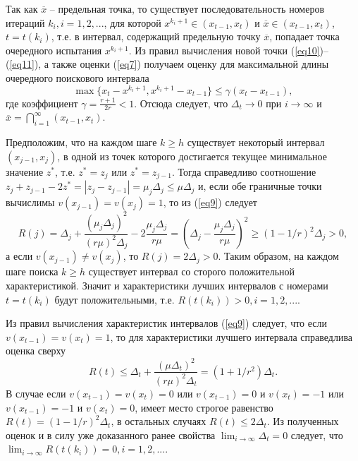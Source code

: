 \documentclass[10pt,a4paper]{book}
\begin{document}
Так как $\overline{x}$ -- предельная точка, то существует последовательность номеров итераций ${k_i}, i = 1, 2, ... $, для которой $x^{k_i+1} \in (x_{t-1}, x_{t})$ и $\overline{x} \in (x_{t-1}, x_{t})$, $t = t(k_i)$, т.е. в интервал, содержащий предельную точку $\overline{x}$, попадает точка очередного испытания $x^{k_{i}+1}$. Из правил вычисления новой точки (\ref{eq10})--(\ref{eq11}), а также оценки (\ref{eq7}) получаем
оценку для максимальной длины очередного поискового интервала
\[
\max\{x_t-x^{k_i+1},x^{k_i+1} - x_{t-1}\} \leq \gamma(x_t - x_{t - 1}),
\]
где коэффициент $\gamma = \frac{r+1}{2r} < 1$. Отсюда следует, что $\Delta_t \to 0$ при $i \to \infty$ и $\overline{x}=\bigcap_{i = 1}^{\infty}{(x_{t-1}, x_t)}$.

Предположим, что на каждом шаге $k \geq h$ существует некоторый интервал $(x_{j-1}, x_{j})$, в одной из точек которого достигается текущее минимальное значение $z^*$, т.е. $z^* = z_j$ или $z^* = z_{j-1}$. Тогда справедливо соотношение $z_j + z_{j-1}-2z^* = |z_j-z_{j-1}| = \mu_j \Delta_j \leq \mu \Delta_j$ и, если обе граничные точки вычислимы $v(x_{j-1}) = v(x_j) = 1$, то из (\ref{eq9}) следует
\[
R(j) = \Delta_j + \frac{(\mu_j \Delta_j)^2}{(r\mu)^2 \Delta_j}-2\frac{\mu_j \Delta_j}{r\mu} = (\Delta_j-\frac{\mu_j\Delta_j}{r\mu})^2 \geq (1-1/r)^2 \Delta_j > 0,
\]
а если $v(x_{j-1}) \neq v(x_j)$, то $R(j)=2\Delta_j>0$. Таким образом, на каждом шаге поиска $k \geq h$ существует интервал со сторого положительной характеристикой. Значит и характеристики лучших интервалов с номерами $t = t(k_i)$ будут положительными, т.е. $R(t(k_i))>0, i = 1, 2, ... $.

Из правил вычисления характеристик интервалов (\ref{eq9}) следует, что если $v(x_{t-1}) = v(x_t) = 1$, то для характеристики лучшего интервала справедлива оценка сверху
\[
R(t) \leq \Delta_t + \frac{(\mu \Delta_t)^2}{(r\mu)^2 \Delta_t} = (1+1/r^2) \Delta_t.
\]
В случае если $v(x_{t-1}) = v(x_t) = 0$ или $v(x_{t-1}) = 0$ и $v(x_t) = -1$ или $v(x_{t-1}) = -1$ и $v(x_t) = 0$, имеет место строгое равенство $R(t) = (1-1/r)^2\Delta_t$, в остальных случаях $R(t) \leq 2\Delta_t$. Из полученных оценок и в силу уже доказанного ранее свойства $\lim_{i \to \infty}{\Delta_t} = 0$ следует, что $\lim_{i \to \infty}{R(t(k_i))}=0, i = 1, 2, ...$.
\end{document}
